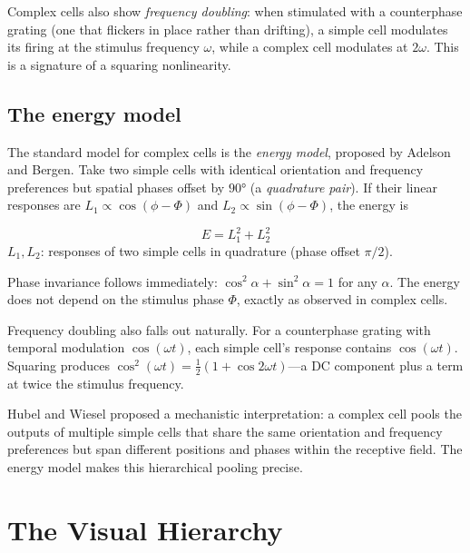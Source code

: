 Complex cells also show \emph{frequency doubling}: when stimulated with a counterphase grating (one that flickers in place rather than drifting), a simple cell modulates its firing at the stimulus frequency $\omega$, while a complex cell modulates at $2\omega$. This is a signature of a squaring nonlinearity.

\subsection{The energy model}

The standard model for complex cells is the \emph{energy model}, proposed by Adelson and Bergen. Take two simple cells with identical orientation and frequency preferences but spatial phases offset by $90°$ (a \emph{quadrature pair}). If their linear responses are $L_1 \propto \cos(\phi - \Phi)$ and $L_2 \propto \sin(\phi - \Phi)$, the energy is

\begin{keyequation}
\begin{equation}
  E = L_1^2 + L_2^2
  \label{eq:energy-model}
\end{equation}
\tcblower
$L_1, L_2$: responses of two simple cells in quadrature (phase offset $\pi/2$).
\end{keyequation}

\noindent Phase invariance follows immediately: $\cos^2\!\alpha + \sin^2\!\alpha = 1$ for any $\alpha$. The energy does not depend on the stimulus phase $\Phi$, exactly as observed in complex cells.

Frequency doubling also falls out naturally. For a counterphase grating with temporal modulation $\cos(\omega t)$, each simple cell's response contains $\cos(\omega t)$. Squaring produces $\cos^2(\omega t) = \frac{1}{2}(1 + \cos 2\omega t)$---a DC component plus a term at twice the stimulus frequency.

Hubel and Wiesel proposed a mechanistic interpretation: a complex cell pools the outputs of multiple simple cells that share the same orientation and frequency preferences but span different positions and phases within the receptive field. The energy model makes this hierarchical pooling precise.

\section{The Visual Hierarchy}
\label{sec:visual-hierarchy}

